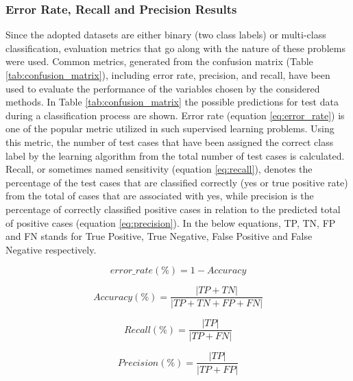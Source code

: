 \documentclass[review]{elsarticle}
\begin{document}
\subsubsection{Error Rate, Recall and Precision Results }

Since the adopted datasets are either binary (two class labels) or multi-class classification, evaluation metrics that go along with the nature of these problems were used. Common metrics, generated from the confusion matrix (Table \ref{tab:confusion_matrix}), including error rate, precision, and recall, have been used to evaluate the performance of the variables chosen by the considered methods. In Table \ref{tab:confusion_matrix} the possible predictions for test data during a classification process are shown. Error rate (equation \ref{eq:error_rate}) is one of the popular metric utilized in such supervised learning problems. Using this metric, the number of test cases that have been assigned the correct class label by the learning algorithm from the total number of test cases is calculated. Recall, or sometimes named sensitivity  (equation \ref{eq:recall}), denotes the percentage of the test cases that are classified correctly (yes or true positive rate) from the total of cases that are associated with yes, while precision is the percentage of correctly classified positive cases in relation to the predicted total of positive cases (equation \ref{eq:precision}). In the below equations, TP, TN, FP and FN stands for True Positive, True Negative, False Positive and False Negative respectively. 

\begin{equation}\label{eq:error_rate}
error\_rate(\%) = 1- Accuracy
\end{equation}


\begin{equation}\label{eq:accuracy}
Accuracy(\%) = \frac{|TP + TN|}{|TP + TN + FP + FN|}
\end{equation}

\begin{equation}\label{eq:recall}
Recall(\%) = \frac{|TP|}{|TP + FN|} 
\end{equation}


\begin{equation}\label{eq:precision}
Precision(\%) = \frac{|TP|}{|TP + FP|} 
\end{equation}
\end{document}
